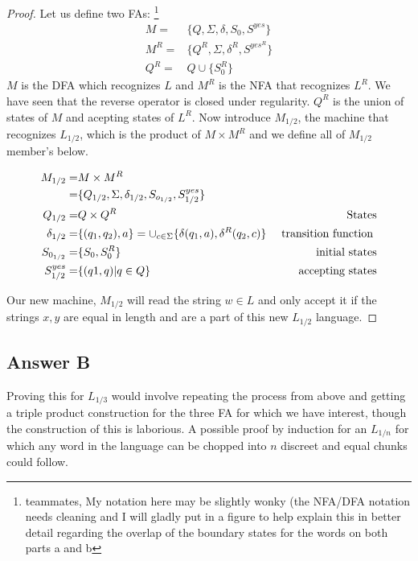 \documentclass[titlepage]{article}\usepackage[]{graphicx}\usepackage[]{color}
\begin{document}
\begin{proof}
	Let us define two FAs:
        \footnote{teammates, My notation here may be slightly wonky (the
          NFA/DFA notation needs cleaning and I will gladly
        put in a figure to help explain this in better detail regarding the overlap of
        the boundary states for the words on both parts a and b}
	\begin{align}
		M =& \{Q, \Sigma, \delta, S_0, S^{yes}\} \\
		M^R =& \{ Q^R, \Sigma, \delta^R, S^{yes^R} \} \\
		Q^R = & Q \cup \{S_{0}^R \}
	\end{align}
	$M$ is the DFA which recognizes $L$ and $M^R$ is the NFA that recognizes
	$L^R$. We have seen that the reverse operator is closed under
	regularity. $Q^R$ is the union of states of $M$ and acepting states of
	$L^R$.
        Now introduce $M_{1/2}$, the machine that recognizes $L_{1/2}$, which
        is the product of $M \times M^R$ and we define all of $M_{1/2}$
        member's below.
        
        \begin{align}
          M_{1/2} = & M \times M^R \\ = &  \{ Q_{1/2}, \Sigma, \delta_{1/2}, S_{o_{1/2}}, S_{1/2}^{yes}  \} & \\
          Q_{1/2} = & Q \times Q^R \hfill & \text{States} \\ 
          \delta_{1/2} = & \{ (q_1, q_2), a\} = \cup_{c \in \Sigma} \{ \delta (q_1, a), \delta^R (q_2, c)\} &\text{ transition function }\\ 
          S_{0_{1/2}} = & \{ S_0, S_0^R \} & \text{ initial states} \\
          S^{yes}_{1/2} = & \{ (q1,q) | q \in Q \} & \text{ accepting states}
	\end{align}

        Our new machine, $M_{1/2}$ will read the string $w \in L$ and only
        accept it if the strings $x,y$ are equal in length and are a part of
        this new $L_{1/2}$ language. 
\end{proof}

\subsection{Answer B}
Proving this for $L_{1/3}$ would involve repeating the process from above and
getting a triple product construction for the three FA for which we have
interest, though the construction of this is laborious. 
A possible proof by induction for an $L_{1/n}$ for which any word in the
language can be chopped into $n$ discreet and equal chunks could follow. 
\end{document}
